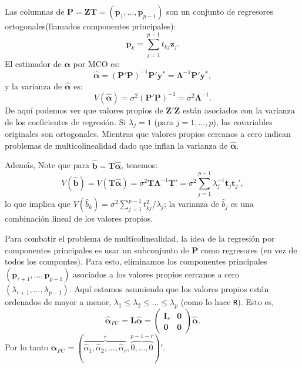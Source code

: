 \documentclass[
]{article}
\begin{document}
Las columnas de \(\boldsymbol P= \boldsymbol Z\boldsymbol T= (\boldsymbol p_{1},\ldots,\boldsymbol p_{p-1})\) son un conjunto de regresores ortogonales(llamados componentes principales):
\[
\boldsymbol p_{k} = \sum_{j=1}^{p-1} t_{kj}\boldsymbol z_{j}.
\]
El estimador de \(\boldsymbol \alpha\) por MCO es:
\[
\widehat{\boldsymbol \alpha}= (\boldsymbol P'\boldsymbol P)^{-1}\boldsymbol P'\boldsymbol y^{*} = \boldsymbol \Lambda^{-1}\boldsymbol P'\boldsymbol y^{*},
\]
y la varianza de \(\widehat{\boldsymbol \alpha}\) es:
\[
V(\widehat{\boldsymbol \alpha}) = \sigma^{2}(\boldsymbol P'\boldsymbol P)^{-1} = \sigma^{2}\boldsymbol \Lambda^{-1}.
\]
De aquí podemos ver que valores propios de \(\boldsymbol Z'\boldsymbol Z\) están asociados con la varianza de los coeficientes de regresión. Si \(\lambda_j=1\) (para \(j=1,\ldots,p\)), las covariables originales son ortogonales. Mientras que valores propios cercanos a cero indican problemas de multicolinealidad dado que inflan la varianza de \(\widehat{\boldsymbol \alpha}\).

Además, Note que para \(\widehat{\boldsymbol b}= \boldsymbol T\widehat{\boldsymbol \alpha}\), tenemos:
\[
V(\widehat{\boldsymbol b}) = V(\boldsymbol T\widehat{\boldsymbol \alpha}) =\sigma^{2}\boldsymbol T\boldsymbol \Lambda^{-1}\boldsymbol T' = \sigma^{2} \sum_{j=1}^{p-1}\lambda_{j}^{-1}\boldsymbol t_{j}\boldsymbol t_{j}',
\]
lo que implica que \(V(\widehat{b}_{k}) = \sigma^{2} \sum_{j=1}^{p-1}t_{kj}^{2}/\lambda_{j}\); la varianza de \(\widehat{b}_j\) es una combinación lineal de los valores propios.

Para combatir el problema de multicolinealidad, la idea de la regresión por componentes principales es usar un subconjunto de \(\boldsymbol P\) como regresores (en vez de todos los compontes). Para esto, eliminamos los componentes principales \((\boldsymbol p_{r+1},\ldots,\boldsymbol p_{p-1})\) asociados a los valores propios cercanos a cero \((\lambda_{r+1},\ldots,\lambda_{p-1})\). Aquí estamos asumiendo que los valores propios están ordenados de mayor a menor, \(\lambda_1 \leq \lambda_2 \leq \ldots \leq \lambda_p\) (como lo hace \texttt{R}). Esto es,
\[
\widehat{\boldsymbol \alpha}_{PC} = \boldsymbol L\widehat{\boldsymbol \alpha}= \begin{pmatrix} \boldsymbol I_{r} & \boldsymbol 0\\ \boldsymbol 0& \boldsymbol 0\end{pmatrix} \widehat{\boldsymbol \alpha}.
\]
Por lo tanto \(\widehat{\boldsymbol \alpha}_{PC} = (\overbrace{\widehat{\alpha}_{1},\widehat{\alpha}_{2},\ldots, \widehat{\alpha}_{r}}^{r},\overbrace{0, \ldots,0}^{p-1-r})'\).
\end{document}
